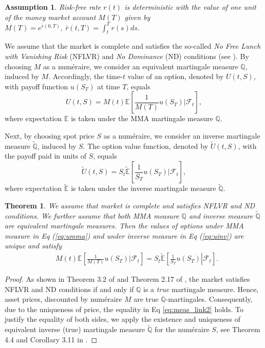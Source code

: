 \documentclass[pdftex,11pt,a4paper] {article}
\newtheorem{theorem}{Theorem}[section]
\newtheorem{assumption}{Assumption}[section]
\begin{document}
\begin{assumption}\label{a:r} Risk-free rate $r(t)$ is deterministic with the value of one unit of the money market account $M(T)$ given by $M(T)=e^{\bar{r}(0, T)}, \ \bar{r}(t, T)=\int^{T}_{t}r(s)ds$.
\end{assumption}
We assume that the market is complete and satisfies the so-called {\it No Free Lunch with Vanishing Risk} (NFLVR) and {\it No Dominance} (ND) conditions (see \cite{JarrowLarsson2012}). By choosing $M$ as a num\'eraire, we consider an equivalent martingale measure $\mathbb{Q}$, induced by $M$.  
Accordingly, the time-$t$ value of an option, denoted by $U(t,S)$, with payoff function $u(S_T)$ at time $T$, equals
\begin{equation}\label{eq:umma}
U(t,S)=M(t)\mathbb{E}\left[\frac{1}{M(T)}\left.u(S_T)\right|\mathcal{F}_{t}\right],
\end{equation}
where expectation $\mathbb{E}$ is taken under the MMA martingale measure $\mathbb{Q}$.

Next, by choosing spot price $S$ as a num\'eraire, we consider an inverse  martingale measure $\tilde{\mathbb{Q}}$, induced by $S$. The option value function, denoted by $\tilde U(t,S)$, with the payoff paid in units of $S$, equals
\begin{equation}\label{eq:uinv}
\tilde U(t,S)=S_t\tilde{\mathbb{E}}\left[\frac{1}{S_T}\left.u(S_T)\right|\mathcal{F}_{t}\right],
\end{equation}
where expectation $\tilde{\mathbb{E}}$ is taken under the inverse martingale measure $\tilde{\mathbb{Q}}$.

\begin{theorem}\label{def1} We assume that market is complete and satisfies NFLVR and ND conditions. We further assume that both MMA measure $\mathbb{Q}$ and inverse measure $\tilde{\mathbb{Q}}$ are equivalent martingale measures. Then the values of options under MMA measure in Eq (\ref{eq:umma}) and under inverse measure in Eq (\ref{eq:uinv}) are unique and satisfy
\begin{equation}\label{eq:meas_link2}
 \begin{split}
& M(t)\mathbb{E}\left[\frac{1}{M(T)}\left.u(S_T)\right|\mathcal{F}_{t}\right] = S_t\tilde{\mathbb{E}}\left[\left.\frac{1}{S_T}u(S_T)\right|\mathcal{F}_{t}\right].
\end{split}
\end{equation}
\end{theorem}
\begin{proof}
As shown in Theorem 3.2 of \cite{JarrowLarsson2012} and Theorem 2.17 of \cite{HerdegenSchweizer2018}, the market satisfies NFLVR and ND conditions if and only if $\mathbb{Q}$ is a {\it true} martingale measure. Hence, asset prices, discounted by num\'eraire $M$ are true $\mathbb{Q}$-martingales. Consequently, due to the uniqueness of price, the equality in Eq \eqref{eq:meas_link2} holds. To justify the equality of both sides, we apply the existence and uniqueness of equivalent inverse (true) martingale measure $\tilde{\mathbb{Q}}$ for the num\'eraire $S$, see Theorem 4.4 and Corollary 3.11 in \cite{HerdegenSchweizer2018}. 
\end{proof}
\end{document}

